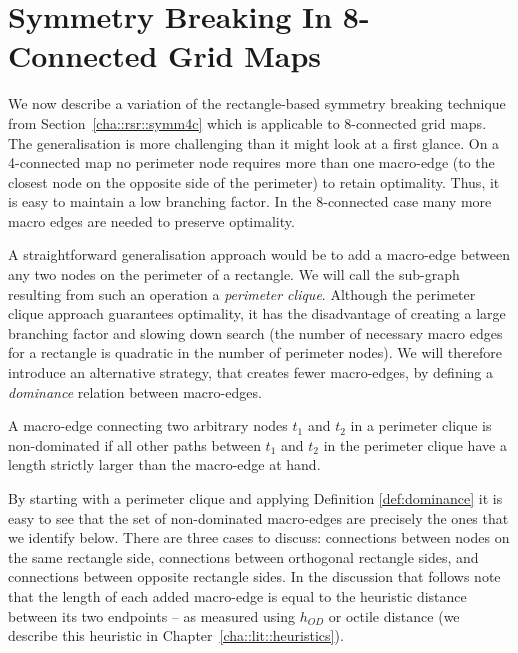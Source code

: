 \section{Symmetry Breaking In 8-Connected Grid Maps}
\label{cha::rsr::symm8c}
We now describe a variation of the rectangle-based symmetry breaking technique
from Section~\ref{cha::rsr::symm4c} which is applicable to 8-connected grid
maps.  The generalisation is more challenging than it might look at a first
glance.  On a 4-connected map no perimeter node requires more than one
macro-edge (to the closest node on the opposite side of the perimeter) to
retain optimality.  Thus, it is easy to maintain a low branching factor.  In
the 8-connected case many more macro edges are needed to preserve optimality.

A straightforward generalisation approach would be to add a macro-edge between
any two nodes on the perimeter of a rectangle.  We will call the sub-graph
resulting from such an operation a \emph{perimeter clique}.  Although the
perimeter clique approach guarantees optimality, it has the disadvantage of
creating a large branching factor and slowing down search (the number of
necessary macro edges for a rectangle is quadratic in the number of perimeter
nodes).  We will therefore introduce an alternative strategy, that creates
fewer macro-edges, by defining a \emph{dominance} relation between
macro-edges.

\begin{definition}
\label{def:dominance}
A macro-edge connecting two arbitrary nodes $t_1$ and $t_2$ in a perimeter
clique is non-dominated if all other paths between $t_1$ and $t_2$ in the
perimeter clique have a length strictly larger than the macro-edge at hand.
\end{definition}

By starting with a perimeter clique and applying Definition
\ref{def:dominance} it is easy to see that the set of non-dominated
macro-edges are precisely the ones that we identify below.  There are three
cases to discuss: connections between nodes on the same rectangle side,
connections between orthogonal rectangle sides, and connections between
opposite rectangle sides.  In the discussion that follows note that the length
of each added macro-edge is equal to the heuristic distance between its two
endpoints -- as measured using $h_{OD}$ or octile distance 
(we describe this heuristic in Chapter~\ref{cha::lit::heuristics}).

